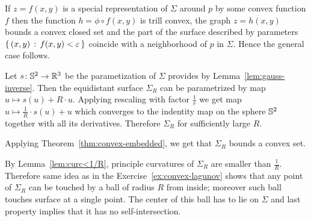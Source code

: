 If $z=f(x,y)$ is a special representation of $\Sigma$ around $p$ by some convex function $f$ then the function $h=\phi\circ f(x,y)$ is trill convex, the graph $z=h(x,y)$ bounds a convex closed set and the part of the surface described by parameters $\left\{\,{(x,y)}\,:\,{f(x,y)<\varepsilon}\,\right\}$ coincide with a neighborhood of $p$ in $\Sigma$.
Hence the general case follows.\qeds

Let $s\colon\mathbb{S}^2\to\mathbb{R}^3$ be the parametization of $\Sigma$ provides by Lemma~\ref{lem:gauss-inverse}.
Then the equidistant surface $\Sigma_R$ can be parametrized by map $u\mapsto s(u)+R\cdot u$.
Applying rescaling with factor $\tfrac1r$ we get map $u\mapsto \tfrac1R\cdot s(u)+u$ which converges to the indentity map on the sphere $\mathbb{S}^2$ together with all its derivatives.
Therefore $\Sigma_R$ for sufficiently large $R$.

Applying Theorem~\ref{thm:convex-embedded}, we get that $\Sigma_R$ bounds a convex set.

By Lemma~\ref{lem:curc<1/R}, principle curvatures of $\Sigma_R$ are smaller than $\tfrac1R$.
Therefore same idea as in the Exercise~\ref{ex:convex-lagunov} shows that any point of $\Sigma_R$ can be touched by a ball of radius $R$ from inside; moreover such ball touches surface at a single point.
The center of this ball has to lie on $\Sigma$ and last property implies that it has no self-intersection.
\qeds

